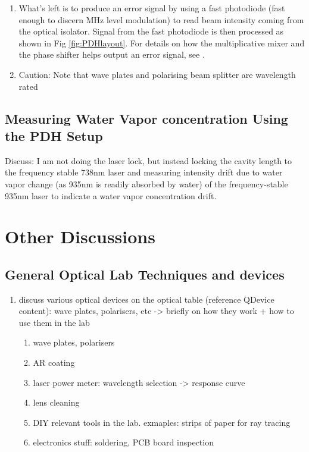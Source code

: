 \documentclass[12pt,A4Paper]{article}
\begin{document}
\begin{enumerate}
    \item What's left is to produce an error signal by using a fast photodiode (fast enough to discern MHz level modulation) to read beam intensity coming from the optical isolator. Signal from the fast photodiode is then processed as shown in Fig \ref{fig:PDHlayout}. For details on how the multiplicative mixer and the phase shifter helps output an error signal, see \cite{PDHintro}.

    \item Caution: Note that wave plates and polarising beam splitter are wavelength rated
\end{enumerate}


\subsection{Measuring Water Vapor concentration Using the PDH Setup}
Discuss: I am not doing the laser lock, but instead locking the cavity length to the frequency stable 738nm laser and measuring intensity drift due to water vapor change (as 935nm is readily absorbed by water) of the frequency-stable 935nm laser to indicate a water vapor concentration drift. 

\section{Other Discussions}
\subsection{General Optical Lab Techniques and devices}
\begin{enumerate}
    \item discuss various optical devices on the optical table (reference QDevice content): wave plates, polarisers, etc -> briefly on how they work + how to use them in the lab 
    \begin{enumerate}
        \item wave plates, polarisers
        \item AR coating
        \item laser power meter: wavelength selection -> response curve
        \item lens cleaning
        \item DIY relevant tools in the lab. exmaples: strips of paper for ray tracing
        \item electronics stuff: soldering, PCB board inspection
        
    \end{enumerate}
\end{enumerate}
\end{document}
